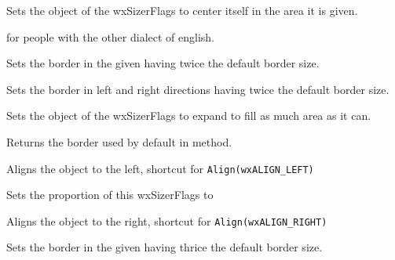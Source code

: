 Sets the object of the wxSizerFlags to center itself in the area it is given.


\label{wxsizerflagscentre}


 for people with the other dialect of english.


\label{wxsizerflagsdoubleborder}


Sets the border in the given  having twice the default border
size.


\label{wxsizerflagsdoublehorzborder}


Sets the border in left and right directions having twice the default border
size.


\label{wxsizerflagsexpand}


Sets the object of the wxSizerFlags to expand to fill as much area as it can.


\label{wxsizerflagsgetdefaultborder}


Returns the border used by default in  method.


\label{wxsizerflagsleft}


Aligns the object to the left, shortcut for \texttt{Align(wxALIGN\_LEFT)}




\label{wxsizerflagsproportion}


Sets the proportion of this wxSizerFlags to 


\label{wxsizerflagsright}


Aligns the object to the right, shortcut for \texttt{Align(wxALIGN\_RIGHT)}




\label{wxsizerflagstriplebleborder}


Sets the border in the given  having thrice the default border
size.


